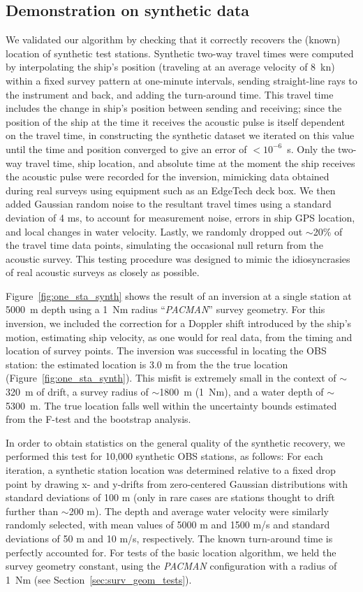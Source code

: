 \documentclass[10pt,titlepage]{article}
\begin{document}
\subsection{Demonstration on synthetic data} \label{Demonstration on synthetic data}
We validated our algorithm by checking that it correctly recovers the (known) location of synthetic test stations. Synthetic two-way travel times were computed by interpolating the ship's position (traveling at an average velocity of 8~kn) within a fixed survey pattern at one-minute intervals, sending straight-line rays to the instrument and back, and adding the turn-around time. This travel time includes the change in ship's position between sending and receiving; since the position of the ship at the time it receives the acoustic pulse is itself dependent on the travel time, in constructing the synthetic dataset we iterated on this value until the time and position converged to give an error of \mbox{$<10^{-6}$ s}. Only the two-way travel time, ship location, and absolute time at the moment the ship receives the acoustic pulse were recorded for the inversion, mimicking data obtained during real surveys using equipment such as an EdgeTech deck box. We then added Gaussian random noise to the resultant travel times using a standard deviation of 4 ms, to account for measurement noise, errors in ship GPS location, and local changes in water velocity. Lastly, we randomly dropped out $\sim$20\% of the travel time data points, simulating the occasional null return from the acoustic survey. This testing procedure was designed to mimic the idiosyncrasies of real acoustic surveys as closely as possible. 

Figure~\ref{fig:one_sta_synth} shows the result of an inversion at a single station at 5000~m depth using a 1~Nm radius ``\textit{PACMAN}'' survey geometry. For this inversion, we included the correction for a Doppler shift introduced by the ship's motion, estimating ship velocity, as one would for real data, from the timing and location of survey points. The inversion was successful in locating the OBS station: the estimated location is 3.0 m from the the true location (Figure~\ref{fig:one_sta_synth}). This misfit is extremely small in the context of $\sim$320~m of drift, a survey radius of $\sim$1800~m (1~Nm), and a water depth of $\sim$5300~m. The true location falls well within the uncertainty bounds estimated from the F-test and the bootstrap analysis. 

In order to obtain statistics on the general quality of the synthetic recovery, we performed this test for 10,000 synthetic OBS stations, as follows: For each iteration, a synthetic station location was determined relative to a fixed drop point by drawing x- and y-drifts from zero-centered Gaussian distributions with standard deviations of 100 m (only in rare cases are stations thought to drift further than $\sim$200 m). The depth and average water velocity were similarly randomly selected, with mean values of 5000 m and 1500 m/s and standard deviations of 50 m and 10 m/s, respectively. The known turn-around time is perfectly accounted for. For tests of the basic location algorithm, we held the survey geometry constant, using the \textit{PACMAN} configuration with a radius of 1~Nm (see Section~\ref{sec:surv_geom_tests}). 
\end{document}
